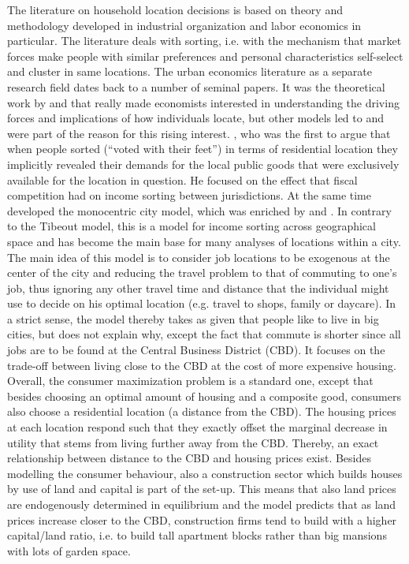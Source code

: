 The literature on household location decisions is based on theory and methodology developed in industrial organization and labor economics in particular. The literature deals with sorting, i.e. with the mechanism that market forces make people with similar preferences and personal characteristics self-select and cluster in same locations. The urban economics literature as a separate research field dates back to a number of seminal papers. It was the theoretical work by \citet{Hicks1932} and \citet{Sjaastad1962} that really made economists interested in understanding the driving forces and implications of how individuals locate, but other models led to and were part of the reason for this rising interest. \citet{Tiebout1956}, who was the first to argue that when people sorted (``voted with their feet'') in terms of residential location they implicitly revealed their demands for the local public goods that were exclusively available for the location in question. He focused on the effect that fiscal competition had on income sorting between jurisdictions. At the same time \citet{Alonso1964} developed the monocentric city model, which was enriched by \citet{Mills1967} and \citet{Muth1969}. In contrary to the Tibeout model, this is a model for income sorting across geographical space and has become the main base for many analyses of locations within a city. The main idea of this model is to consider job locations to be exogenous at the center of the city and reducing the travel problem to that of commuting to one's job, thus ignoring any other travel time and distance that the individual might use to decide on his optimal location (e.g. travel to shops, family or daycare). In a strict sense, the model thereby takes as given that people like to live in big cities, but does not explain why, except the fact that commute is shorter since all jobs are to be found at the Central Business District (CBD). It focuses on the trade-off between living close to the CBD at the cost of more expensive housing. Overall, the consumer maximization problem is a standard one, except that besides choosing an optimal amount of housing and a composite good, consumers also choose a residential location (a distance from the CBD). The housing prices at each location respond such that they exactly offset the marginal decrease in utility that stems from living further away from the CBD. Thereby, an exact relationship between distance to the CBD and housing prices exist. Besides modelling the consumer behaviour, also a construction sector which builds houses by use of land and capital is part of the set-up. This means that also land prices are endogenously determined in equilibrium and the model predicts that as land prices increase closer to the CBD, construction firms tend to build with a higher capital/land ratio, i.e. to build tall apartment blocks rather than big mansions with lots of garden space. 

